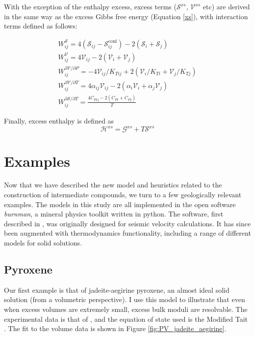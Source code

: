 With the exception of the enthalpy excess, excess terms ($\mathcal{S}^{xs}$, $\mathcal{V}^{xs}$ etc) are derived in the same way as the excess Gibbs free energy (Equation \ref{xs}), with interaction terms defined as follows:

\begin{eqnarray}
  W^{\mathcal{S}}_{ij} = 4 (\mathcal{S}_{ij} - \mathcal{S}^{\textrm{conf}}_{ij}) - 2(\mathcal{S}_i + \mathcal{S}_j) \\
  W^{\mathcal{V}}_{ij} = 4 \mathcal{V}_{ij} - 2(\mathcal{V}_i + \mathcal{V}_j) \\
  W^{\partial\mathcal{V}/\partial P}_{ij} = -4 \mathcal{V}_{ij}/K_{T{ij}} + 2(\mathcal{V}_{i}/K_{T{i}} + \mathcal{V}_{j}/K_{T{j}}) \\
  W^{\partial\mathcal{V}/\partial T}_{ij} = 4 \alpha_{ij} \mathcal{V}_{ij} - 2(\alpha_{i} \mathcal{V}_i + \alpha_{j} \mathcal{V}_j) \\
  W^{\partial\mathcal{S}/\partial T}_{ij} = \frac{4 C_{P{ij}} - 2(C_{P{i}} + C_{P{j}})}{T} 
\end{eqnarray}

Finally, excess enthalpy is defined as
\begin{equation}
 \mathcal{H}^{xs} = \mathcal{G}^{xs} + T\mathcal{S}^{xs}
\end{equation}


\section{Examples}
Now that we have described the new model and heuristics related to the construction of intermediate compounds, we turn to a few geologically relevant examples. The models in this study are all implemented in the open software \emph{burnman}, a mineral physics toolkit written in python. The software, first described in \cite{CHRU2014}, was originally designed for seismic velocity calculations. It has since been augmented with thermodynamics functionality, including a range of different models for solid solutions.


\subsection{Pyroxene}
Our first example is that of jadeite-aegirine pyroxene, an almost ideal solid solution (from a volumetric perspective). I use this model to illustrate that even when excess volumes are extremely small, excess bulk moduli are resolvable. The experimental data is that of \cite{NBLBT2006}, and the equation of state used is the Modified Tait \citep{HP2011}. The fit to the volume data is shown in Figure \ref{fig:PV_jadeite_aegirine}.

